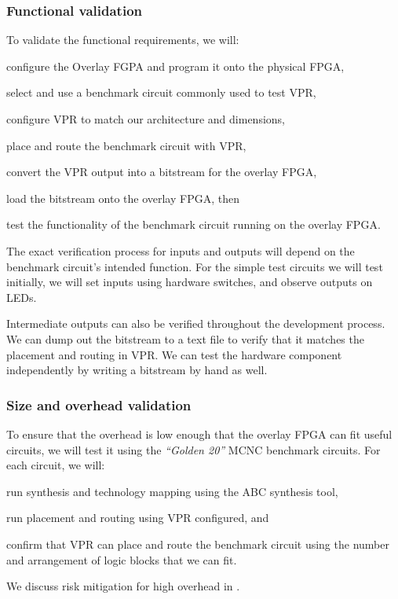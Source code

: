\subsubsection{Functional validation}

To validate the functional requirements, we will:
\begin{enumeration}
	\item configure the Overlay FGPA and program it onto the physical FPGA,
	\item select and use a benchmark circuit commonly used to test VPR,
	\item configure VPR to match our architecture and dimensions,
	\item place and route the benchmark circuit with VPR,
	\item convert the VPR output into a bitstream for the overlay FPGA,
	\item load the bitstream onto the overlay FPGA, then 
	\item test the functionality of the benchmark circuit running on the overlay FPGA.
\end{enumeration}

The exact verification process for inputs and outputs will depend on the benchmark circuit's intended function.
For the simple test circuits we will test initially, we will set inputs using hardware switches, and observe outputs on LEDs.

Intermediate outputs can also be verified throughout the development process.
We can dump out the bitstream to a text file to verify that it matches the placement and routing in VPR.
We can test the hardware component independently by writing a bitstream by hand as well.


\subsubsection{Size and overhead validation}

To ensure that the overhead is low enough that the overlay FPGA can fit useful circuits, we will test it using the \emph{``Golden 20''} MCNC benchmark circuits.
For each circuit, we will:
\begin{enumeration}
	\item run synthesis and technology mapping using the ABC synthesis tool,
	\item run placement and routing using VPR configured, and
	\item confirm that VPR can place and route the benchmark circuit using the number and arrangement of logic blocks that we can fit.
\end{enumeration}
We discuss risk mitigation for high overhead in .

